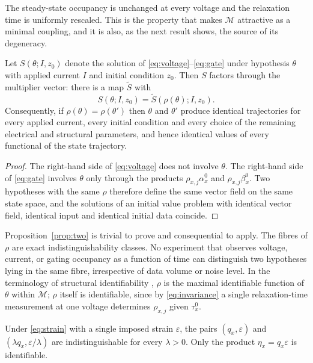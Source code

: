 \noindent The steady-state occupancy is unchanged at every voltage and the
relaxation time is uniformly rescaled. This is the property that makes
$\mathcal{M}$ attractive as a minimal coupling, and it is also, as the next
result shows, the source of its degeneracy.

\begin{proposition}
\label{prop:two}
Let $S(\theta;I,z_0)$ denote the solution of \eqref{eq:voltage}--\eqref{eq:gate}
under hypothesis $\theta$ with applied current $I$ and initial condition $z_0$.
Then $S$ factors through the multiplier vector: there is a map $\tilde S$ with
\begin{equation}
S(\theta;I,z_0)=\tilde S\!\left(\rho(\theta);I,z_0\right).
\label{eq:factor}
\end{equation}
Consequently, if $\rho(\theta)=\rho(\theta')$ then $\theta$ and $\theta'$ produce
identical trajectories for every applied current, every initial condition and
every choice of the remaining electrical and structural parameters, and hence
identical values of every functional of the state trajectory.
\end{proposition}

\begin{proof}
The right-hand side of \eqref{eq:voltage} does not involve $\theta$. The
right-hand side of \eqref{eq:gate} involves $\theta$ only through the products
$\rho_{x,j}\alpha_x^0$ and $\rho_{x,j}\beta_x^0$. Two hypotheses with the same
$\rho$ therefore define the same vector field on the same state space, and the
solutions of an initial value problem with identical vector field, identical
input and identical initial data coincide.
\end{proof}

Proposition~\ref{prop:two} is trivial to prove and consequential to apply. The
fibres of $\rho$ are exact indistinguishability classes. No experiment that
observes voltage, current, or gating occupancy as a function of time can
distinguish two hypotheses lying in the same fibre, irrespective of data volume
or noise level. In the terminology of structural identifiability
\citep{bellman1970,chis2011}, $\rho$ is the maximal identifiable function of
$\theta$ within $\mathcal{M}$; $\rho$ itself is identifiable, since by
\eqref{eq:invariance} a single relaxation-time measurement at one voltage
determines $\rho_{x,j}$ given $\tau_x^0$.

\begin{corollary}
\label{cor:one}
Under \eqref{eq:strain} with a single imposed strain $\varepsilon$, the pairs
$(q_x,\varepsilon)$ and $(\lambda q_x,\varepsilon/\lambda)$ are
indistinguishable for every $\lambda>0$. Only the product
$\eta_x=q_x\varepsilon$ is identifiable.
\end{corollary}

